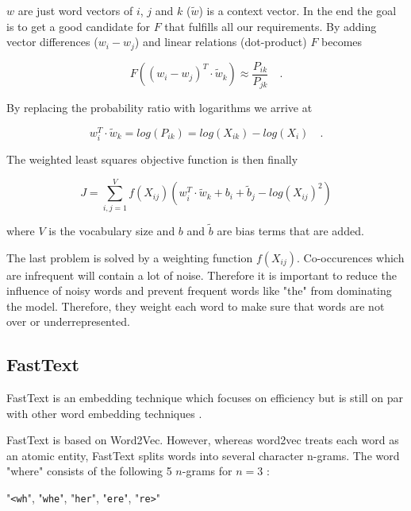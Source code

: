 $w$ are just word vectors of $i$, $j$ and $k$ {($\widetilde{w}$)} is a context vector. In the end the goal is to get a good candidate for $F$ that fulfills all our requirements. By adding vector differences {($w_i - w_j$)} and linear relations {(dot-product)} $F$ becomes

\begin{equation}
	F((w_i - w_j)^T \cdot \widetilde{w}_k) \approx \frac{P_{ik}}{P_{jk}} \quad .
\end{equation}

By replacing the probability ratio with logarithms we arrive at

\begin{equation}
	w_i^T \cdot \widetilde{w}_k = log(P_{ik}) = log(X_{ik}) - log(X_i) \quad .
\end{equation}

The weighted least squares objective function is then finally

\begin{equation}
	J = \sum_{i,j=1}^V f(X_{ij}) (w_i^T \cdot \widetilde{w}_k + b_i+\widetilde{b}_j - log(X_{ij})^2)
\end{equation}

where $V$ is the vocabulary size and $b$ and $\widetilde{b}$ are bias terms that are added.
\medskip

The last problem is solved by a weighting function $f(X_{ij})$. Co-occurences which are infrequent will contain a lot of noise. Therefore it is important to reduce the influence of noisy words and prevent frequent words like "the" from dominating the model. Therefore, they weight each word to make sure that words are not over or underrepresented.

\subsection{FastText}

FastText is an embedding technique which focuses on efficiency but is still on par with other word embedding techniques \cite{Joulin2016}.
\medskip

FastText is based on Word2Vec. However, whereas word2vec treats each word as an atomic entity, FastText splits words into several character n-grams. The word "where" consists of the following 5 $n$-grams for $n=3$ \cite{Bojanowski2017}: 

\begin{center}
	"\verb|<wh|", "\verb|whe|", "\verb|her|", "\verb|ere|", "\verb|re>|"
\end{center}

